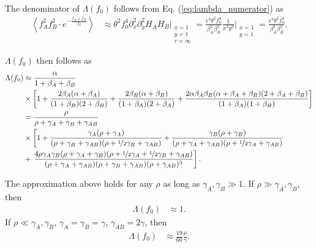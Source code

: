 \documentclass[11pt]{article}
\begin{document}
The denominator of $\Lambda(f_0)$ follows from Eq. (\ref{eq:lambda_numerator}) as 
\begin{align}
    \left\langle f_A^2f_B^2\cdot e^{-\frac{f_{A}+f_{B}}{f_0}}\right\rangle &\approx \theta^2 f_0^4 \partial_x^2 \partial_y^2 H_A H_B \Bigg\vert_{\substack{x=1 \\ y=1 \\ \tau=\infty}} = \frac{\epsilon^4 \theta^2 f_0^4}{\beta_A^2 \beta_B^2} \frac{1}{x^2y^2}\Bigg\vert_{\substack{x=1 \\ y=1}} = \frac{\epsilon^4 \theta^2 f_0^4}{\beta_A^2 \beta_B^2}.
\end{align}

$\Lambda(f_0)$ then follows as
\begin{align}\label{eq:lambda_strong_s}
    \Lambda(f_0) &\approx \frac{\alpha}{1+\beta_A + \beta_B} \\ \nonumber
    &\times \left[1 +  \frac{2\beta_A(\alpha+\beta_A)}{(1+\beta_B)(2+\beta_B)}
    +\frac{2\beta_B(\alpha+\beta_B)}{(1+\beta_A)(2+\beta_A)} + \frac{2 \alpha \beta_A \beta_B (\alpha+\beta_A+\beta_B)(2+\beta_A+\beta_B)}{(1+\beta_A)(1+\beta_B)}\right] \\ \nonumber
    &= \frac{\rho}{\rho + \gamma_A + \gamma_B + \gamma_{AB}} \\\nonumber
    &\times \left[1 +\frac{\gamma_A(\rho + \gamma_{A})}{(\rho + \gamma_B + \gamma_{AB})(\rho + \nicefrac{1}{2}\gamma_B + \gamma_{AB})} 
    +\frac{\gamma_B(\rho + \gamma_{B})}{(\rho + \gamma_A + \gamma_{AB})(\rho + \nicefrac{1}{2}\gamma_A + \gamma_{AB})} \right. \\ \nonumber
    &+\left. \frac{4 \rho \gamma_A \gamma_B (\rho+\gamma_A+\gamma_B)(\rho+\nicefrac{1}{2}\gamma_A+\nicefrac{1}{2}\gamma_B+\gamma_{AB})}{(\rho+\gamma_A+\gamma_{AB})(\rho+\gamma_B+\gamma_{AB})(\rho+\gamma_{AB})^3}\right].
\end{align}

The approximation above holds for any $\rho$ as long as $\gamma_{A}, \gamma_{B} \gg 1$. If $\rho \gg \gamma_A, \gamma_B$, then 
\begin{align}
    \Lambda(f_0) &\approx 1.
\end{align}
If $\rho \ll \gamma_A, \gamma_B$, $\gamma_A=\gamma_B=\gamma$, $\gamma_{AB}=2\gamma$, then
\begin{align}
    \Lambda(f_0) &\approx \frac{19}{60}\frac{\rho}{\gamma}.
\end{align} 
\end{document}
